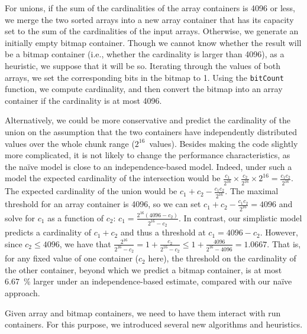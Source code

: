 \documentclass[times]{speauth}
\begin{document}
\begin{description}
	For unions, if the sum of the cardinalities of the array containers is  \num{4096} or less, we  merge the two sorted arrays into a new array container that has its capacity set to the sum of the cardinalities of the input arrays.
	 Otherwise, we generate an initially empty bitmap container. Though we cannot know whether the result will be a bitmap container (i.e., whether the cardinality is larger than \num{4096}), as a heuristic, we suppose that it will be so.
Iterating through the values of both arrays, we set the corresponding bits in the bitmap to 1. Using the \texttt{bitCount} function, we compute cardinality, and then convert the bitmap into an array container if the cardinality is
at most
\num{4096}.

Alternatively, we could be more conservative and predict the cardinality of the union on the assumption that the two containers have independently distributed values over the whole chunk range ($2^{16}$~values). Besides making the code slightly more complicated,
 it is not likely to change the performance characteristics, as the na\"ive model is close to an independence-based model.  Indeed, under such a model the expected cardinality of the intersection would be $\frac{c_1}{2^{16}} \times \frac{c_2}{2^{16}} \times 2^{16} = \frac{c_1 c_2}{ 2^{16}}$.
 The expected cardinality of the union would be $c_1 + c_2 -\frac{c_1 c_2}{ 2^{16}} $. The maximal threshold for an array container is \num{4096}, so we can set  $c_1 + c_2 -\frac{c_1 c_2}{ 2^{16}} =4096$ and
solve for $c_1$ as a function of $c_2$: $c_1 = \frac{2^{16} (4096-c_2)}{2^{16}-c_2}$. In contrast, our simplistic model predicts a cardinality of $c_1+c_2$ and thus a threshold at $c_1 = 4096 - c_2$.
However, since $c_2\leq 4096$, we have that
$\frac{2^{16}}{2^{16}-c_2}= 1 + \frac{c_2}{2^{16}-c_2} \leq  1 + \frac{4096}{2^{16}-4096}= 1.0667$.
That is,  for any fixed value of one container ($c_2$ here), the threshold on the cardinality of the other container,  beyond which we predict a bitmap container, is at most
\SI{6.67}{\percent}
larger under an independence-based estimate, compared with our na\"ive approach.
\end{description}



Given array and bitmap containers, we need to have them interact
with run containers. For this purpose, we introduced several new algorithms and heuristics.
\end{document}
